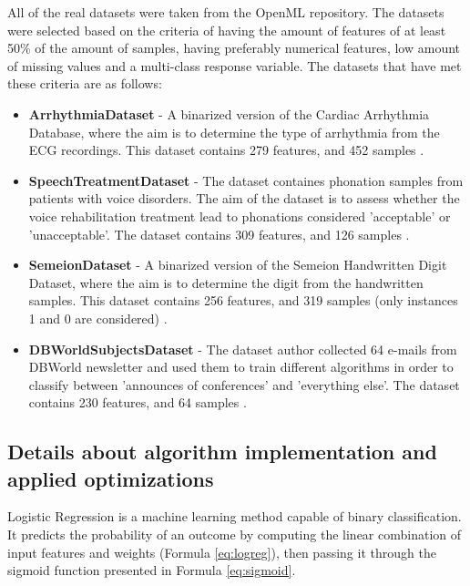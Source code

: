 \documentclass[12pt]{article}
\begin{document}
All of the real datasets were taken from the OpenML \cite{OpenML2013} repository. The datasets were selected based on the criteria of having the amount of features of at least 50\% of the amount of samples, having preferably numerical features, low amount of missing values and a multi-class response variable. The datasets that have met these criteria are as follows:
\begin{itemize}
    \item \textbf{ArrhythmiaDataset} - A binarized version of the Cardiac Arrhythmia Database, where the aim is to determine the type of arrhythmia from the ECG recordings. This dataset contains 279 features, and 452 samples \cite{arrhythmia_5}.
    \item \textbf{SpeechTreatmentDataset} - The dataset containes phonation samples from patients with voice disorders. The aim of the dataset is to assess whether the voice rehabilitation treatment lead to phonations considered 'acceptable' or 'unacceptable'. The dataset contains 309 features, and 126 samples \cite{lsvt_voice_rehabilitation_282}.
    
    \item \textbf{SemeionDataset} - A binarized version of the Semeion Handwritten Digit Dataset, where the aim is to determine the digit from the handwritten samples. This dataset contains 256 features, and 319 samples (only instances 1 and 0 are considered) \cite{semeion_handwritten_digit_178}.
    \item \textbf{DBWorldSubjectsDataset} - The dataset author collected 64 e-mails from DBWorld newsletter and used them to train different algorithms in order to classify between 'announces of conferences' and 'everything else'. The dataset contains 230 features, and 64 samples \cite{dbworld_e-mails_219}.

\end{itemize}


\subsection{Details about algorithm implementation and applied optimizations}


Logistic Regression is a machine learning method capable of binary classification. It predicts the probability of an outcome by computing the linear combination of input features and weights (Formula \ref{eq:logreg}), then passing it through the sigmoid function presented in Formula \ref{eq:sigmoid}. 
\end{document}
